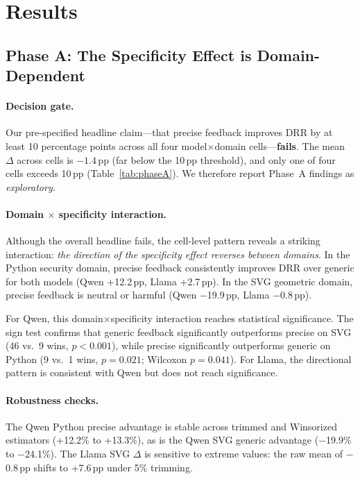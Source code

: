 \section{Results}
\label{sec:results}

\subsection{Phase A: The Specificity Effect is Domain-Dependent}
\label{sec:results-phaseA}

\paragraph{Decision gate.}
Our pre-specified headline claim---that precise feedback improves DRR by at least 10 percentage points across all four model$\times$domain cells---\textbf{fails}. The mean $\Delta$ across cells is $-1.4$\,pp (far below the 10\,pp threshold), and only one of four cells exceeds 10\,pp (Table~\ref{tab:phaseA}). We therefore report Phase~A findings as \emph{exploratory}.

\paragraph{Domain $\times$ specificity interaction.}
Although the overall headline fails, the cell-level pattern reveals a striking interaction: \emph{the direction of the specificity effect reverses between domains}. In the Python security domain, precise feedback consistently improves DRR over generic for both models (Qwen +12.2\,pp, Llama +2.7\,pp). In the SVG geometric domain, precise feedback is neutral or harmful (Qwen $-$19.9\,pp, Llama $-$0.8\,pp).

For Qwen, this domain$\times$specificity interaction reaches statistical significance. The sign test confirms that generic feedback significantly outperforms precise on SVG (46 vs.\ 9 wins, $p < 0.001$), while precise significantly outperforms generic on Python (9 vs.\ 1 wins, $p = 0.021$; Wilcoxon $p = 0.041$). For Llama, the directional pattern is consistent with Qwen but does not reach significance.

\paragraph{Robustness checks.}
The Qwen Python precise advantage is stable across trimmed and Winsorized estimators (+12.2\% to +13.3\%), as is the Qwen SVG generic advantage ($-$19.9\% to $-$24.1\%). The Llama SVG $\Delta$ is sensitive to extreme values: the raw mean of $-$0.8\,pp shifts to +7.6\,pp under 5\% trimming.

